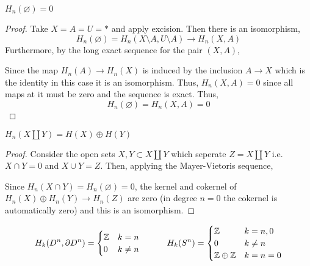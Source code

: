 \documentclass[12pt]{extarticle}
\begin{document}
\begin{proposition}
$H_n(\varnothing) = 0$
\end{proposition}

\begin{proof}
Take $X = A = U = *$ and apply excision. Then there is an isomorphism,
\[ H_n(\varnothing) = H_n(X \setminus A, U \setminus A) \to H_n(X, A) \]
Furthermore, by the long exact sequence for the pair $(X, A)$,
\begin{center}
\end{center}
Since the map $H_n(A) \to H_n(X)$ is induced by the inclusion $A \to X$ which is the identity in this case it is an isomorphism. Thus, $H_n(X, A) = 0$ since all maps at it must be zero and the sequence is exact.
Thus,
\[ H_n(\varnothing) = H_n(X, A) = 0 \]
\end{proof}

\begin{proposition}
$H_n(X \coprod Y) = H(X) \oplus H(Y)$
\end{proposition}

\begin{proof}
Consider the open sets $X, Y \subset X \coprod Y$ which seperate $Z = X \coprod Y$ i.e. $X \cap Y = 0$ and $X \cup Y = Z$. Then, applying the Mayer-Vietoris sequence,
\begin{center}
\end{center}
Since $H_{n}(X \cap Y) = H_{n}(\varnothing) = 0$, the kernel and cokernel of $H_n(X) \oplus H_n(Y) \to H_n(Z)$ are zero (in degree $n = 0$ the cokernel is automatically zero) and this is an isomorphism. 
\end{proof}

\begin{proposition}
\[ H_k(D^n, \partial D^n) = \begin{cases}
\mathbb{Z} & k = n
\\
0 & k \neq n
\end{cases}
\quad \quad \quad 
H_k(S^n) = \begin{cases}
\mathbb{Z} & k = n, 0
\\
0 & k \neq n 
\\
\mathbb{Z} \oplus \mathbb{Z} & k = n = 0
\end{cases} \]
\end{proposition} 
\end{document}
